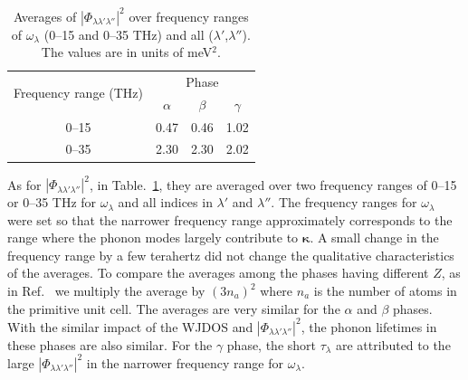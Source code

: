 \documentclass[twocolumn,amsmath,amssymb,a4paper,prb,superscriptaddress,floatfix]{revtex4-1}
\begin{document}
\begin{table}[ht]
 \caption{\label{table:aveavepp} Averages of
 $|\Phi_{\lambda\lambda'\lambda''}|^2$ over frequency ranges of
 $\omega_\lambda$ (0--15 and 0--35 THz) and all ($\lambda'$,$\lambda''$). The
 values are in units of meV$^2$.}
 \begin{ruledtabular}
  \begin{tabular}{cccc}
   \multirow{2}{*}{Frequency range (THz)}
   & \multicolumn{3}{c}{Phase}  \\
   \cline{2-4} & $\alpha$ & $\beta$ & $\gamma$ \\
   \hline
   \multirow{1}{*}{0--15} & 0.47 & 0.46 & 1.02 \\
   \multirow{1}{*}{0--35} & 2.30 & 2.30 & 2.02
  \end{tabular}
 \end{ruledtabular}
\end{table}

As for $|\Phi_{\lambda\lambda'\lambda''}|^2$, in Table.~\ref{table:aveavepp},
they are averaged over two frequency ranges of 0--15 or 0--35 THz for
$\omega_\lambda$ and all indices in $\lambda'$ and $\lambda''$.  The frequency
ranges for $\omega_\lambda$ were set so that the narrower frequency range
approximately corresponds to the range where the phonon modes largely contribute
to $\boldsymbol{\kappa}$. A small change in the frequency range by a few
terahertz did not change the qualitative characteristics of the averages.  To
compare the averages among the phases having different $Z$, as in
Ref.~ we multiply the average by $(3n_a)^2$ where $n_a$ is the
number of atoms in the primitive unit cell. The averages are very similar for
the $\alpha$ and $\beta$ phases. With the similar impact of the WJDOS and
$|\Phi_{\lambda\lambda'\lambda''}|^2$, the phonon lifetimes in these phases are
also similar. For the $\gamma$ phase, the short $\tau_\lambda$ are attributed to
the large $|\Phi_{\lambda\lambda'\lambda''}|^2$ in the narrower frequency range
for $\omega_\lambda$.
\end{document}
